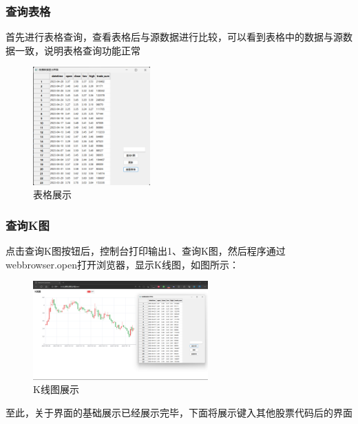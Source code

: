 \documentclass[UTF8,12pt]{article}
\begin{document}
\subsubsection{查询表格}
首先进行表格查询，查看表格后与源数据进行比较，可以看到表格中的数据与源数据一致，说明表格查询功能正常
\begin{figure}[htbp]
    \centering
    \includegraphics[width=0.4\textwidth]{img/8.png}
    \caption{表格展示}
\end{figure}

\subsubsection{查询K图}
点击查询K图按钮后，控制台打印输出1、查询K图，然后程序通过webbrowser.open打开浏览器，显示K线图，如图所示：
\begin{figure}[htbp]
    \centering
    \includegraphics[width=0.6\textwidth]{img/14.png}
    \caption{K线图展示}
\end{figure}

至此，关于界面的基础展示已经展示完毕，下面将展示键入其他股票代码后的界面
\end{document}
